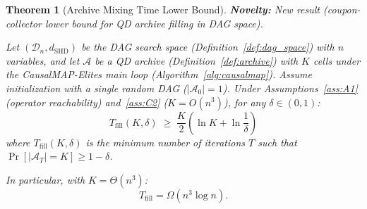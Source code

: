 \documentclass{article}
\theoremstyle{definition}
\theoremstyle{plain}
\newtheorem{theorem}{Theorem}
\theoremstyle{remark}
\begin{document}
\begin{theorem}[Archive Mixing Time Lower Bound]
\label{thm:mixing_time}
\textbf{Novelty:} New result (coupon-collector lower bound for QD archive filling in DAG space).

Let $(\mathcal{D}_n, d_{\mathrm{SHD}})$ be the DAG search space (Definition~\ref{def:dag_space})
with $n$ variables, and let $\mathcal{A}$ be a QD archive (Definition~\ref{def:archive}) with
$K$ cells under the CausalMAP-Elites main loop (Algorithm~\ref{alg:causalmap}). Assume
initialization with a single random DAG ($|\mathcal{A}_0| = 1$). Under
Assumptions~\ref{ass:A1} (operator reachability) and~\ref{ass:C2} ($K = O(n^3)$),
for any $\delta \in (0,1)$:
\begin{equation}
  T_{\mathrm{fill}}(K, \delta) \;\geq\; \frac{K}{2}\left(\ln K + \ln \frac{1}{\delta}\right)
\end{equation}
where $T_{\mathrm{fill}}(K,\delta)$ is the minimum number of iterations $T$ such that
$\Pr[|\mathcal{A}_T| = K] \geq 1 - \delta$.

In particular, with $K = \Theta(n^3)$:
\begin{equation}
  T_{\mathrm{fill}} = \Omega(n^3 \log n).
\end{equation}
\end{theorem}
\end{document}
